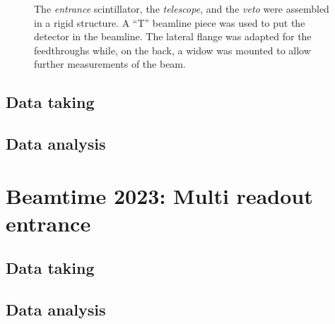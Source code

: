 \begin{refsection}
        \begin{figure}   
            \centering
            \hfill
            \caption{The \textit{entrance} scintillator, the \textit{telescope}, and the \textit{veto} were assembled in a rigid structure. A ``T'' beamline piece was used to put the detector in the beamline. The lateral flange was adapted for the feedthroughs while, on the back, a \mylar widow was mounted to allow further measurements of the beam.}
            \label{fig:muEDM:beamtime2021:setup}
        \end{figure}
    \subsection{Data taking}
    \subsection{Data analysis}
    
\section{Beamtime 2023: Multi readout entrance}
\label{muEDM:beamtime2023}
    \subsection{Data taking}
    \subsection{Data analysis}

\printbibliography[
    heading = bibliographychapter,
    title=Bibliography on muEDM entrance detector
]

\end{refsection}


